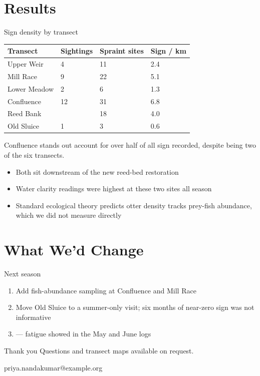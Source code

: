 \documentclass{beamer}
\begin{document}
\section{Results}

\begin{frame}{Sign density by transect}
  \begin{table}
    \centering
    \tablesize
    \begin{tabularx}{\textwidth}{lYYY}
      \toprule
      Transect & Sightings & Spraint sites & Sign / km \\
      \midrule
      Upper Weir     & 4  & 11 & 2.4 \\
      Mill Race      & 9  & 22 & 5.1 \\
      Lower Meadow   & 2  & 6  & 1.3 \\
      Confluence     & 12 & 31 & 6.8 \\
      Reed Bank      &   & 18 & 4.0 \\
      Old Sluice     & 1  & 3  & 0.6 \\
      \bottomrule
    \end{tabularx}
  \end{table}
\end{frame}

\begin{frame}{Confluence stands out}
   account for over half of all sign recorded, despite being two of the six transects.
  \begin{itemize}
    \item Both sit downstream of the new reed-bed restoration
    \item Water clarity readings were highest at these two sites all season
    \item Standard ecological theory predicts otter density tracks prey-fish abundance, which we did not measure directly
  \end{itemize}
\end{frame}

\section{What We'd Change}

\begin{frame}{Next season}
  \begin{enumerate}
    \item Add fish-abundance sampling at Confluence and Mill Race
    \item Move Old Sluice to a summer-only visit; six months of near-zero sign was not informative
    \item {} --- fatigue showed in the May and June logs
  \end{enumerate}
\end{frame}

\begin{frame}{Thank you}
  \centering
  \Large Questions and transect maps available on request.

  \normalsize priya.nandakumar@example.org
\end{frame}
\end{document}
